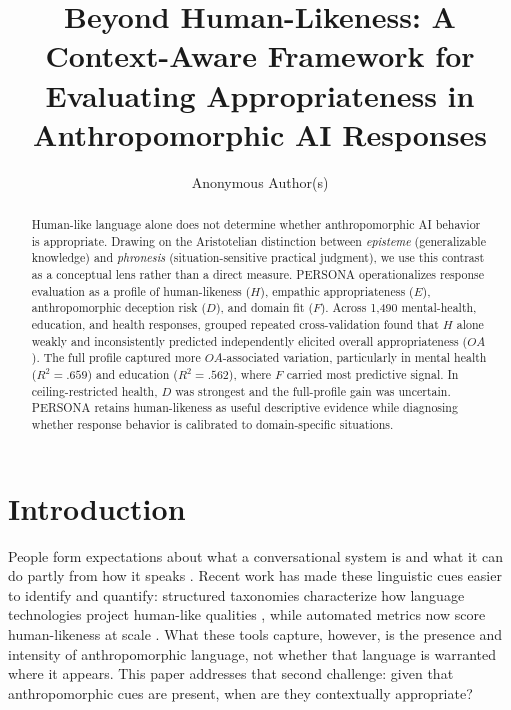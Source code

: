 \documentclass[manuscript,review,anonymous]{acmart}
\title{Beyond Human-Likeness: A Context-Aware Framework for Evaluating Appropriateness in Anthropomorphic AI Responses}
\author{Anonymous Author(s)}
\affiliation{%
  \institution{Anonymous Institution}
  \country{}}
\begin{document}
\begin{abstract}
Human-like language alone does not determine whether anthropomorphic AI behavior is appropriate. Drawing on the Aristotelian distinction between \textit{episteme} (generalizable knowledge) and \textit{phronesis} (situation-sensitive practical judgment), we use this contrast as a conceptual lens rather than a direct measure. PERSONA operationalizes response evaluation as a profile of human-likeness ($H$), empathic appropriateness ($E$), anthropomorphic deception risk ($D$), and domain fit ($F$). Across 1,490 mental-health, education, and health responses, grouped repeated cross-validation found that $H$ alone weakly and inconsistently predicted independently elicited overall appropriateness ($OA$). The full profile captured more $OA$-associated variation, particularly in mental health ($R^2=.659$) and education ($R^2=.562$), where $F$ carried most predictive signal. In ceiling-restricted health, $D$ was strongest and the full-profile gain was uncertain. PERSONA retains human-likeness as useful descriptive evidence while diagnosing whether response behavior is calibrated to domain-specific situations.
\end{abstract}


\maketitle

\section{Introduction}

People form expectations about what a conversational system is and what it can do partly from how it speaks \cite{nass2000, reeves1996}. Recent work has made these linguistic cues easier to identify and quantify: structured taxonomies characterize how language technologies project human-like qualities \cite{abercrombie2023, devrio2025}, while automated metrics now score human-likeness at scale \cite{cheng2025}. What these tools capture, however, is the presence and intensity of anthropomorphic language, not whether that language is warranted where it appears. This paper addresses that second challenge: given that anthropomorphic cues are present, when are they contextually appropriate?
\end{document}
